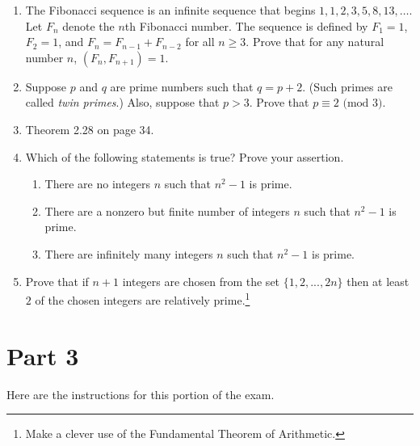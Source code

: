 \documentclass[11pt]{article}
\theoremstyle{definition}
\begin{document}
\begin{enumerate}[resume]

\item The Fibonacci sequence is an infinite sequence that begins $1,1,2,3, 5,8,13,\ldots$.  Let $F_{n}$ denote the $n$th Fibonacci number.  The sequence is defined by $F_{1}=1$, $F_{2}=1$, and $F_{n}=F_{n-1}+F_{n-2}$ for all $n\geq 3$.  Prove that for any natural number $n$, $(F_{n},F_{n+1})=1$.

\item Suppose $p$ and $q$ are prime numbers such that $q=p+2$.  (Such primes are called \emph{twin primes}.)  Also, suppose that $p>3$.  Prove that $p\equiv 2 \mbox{ (mod } 3)$.

\item Theorem 2.28 on page 34.

\item Which of the following statements is true?  Prove your assertion.
\begin{enumerate}

\item There are no integers $n$ such that $n^{2}-1$ is prime.

\item There are a nonzero but finite number of integers $n$ such that $n^{2}-1$ is prime.

\item There are infinitely many integers $n$ such that $n^{2}-1$ is prime.

\end{enumerate}

\item Prove that if $n+1$ integers are chosen from the set $\{1,2,...,2n\}$ then at least $2$ of the chosen integers are relatively prime.\footnote{Make a clever use of the Fundamental Theorem of Arithmetic.}

\end{enumerate}

\section*{Part 3}

Here are the instructions for this portion of the exam.
\end{document}
